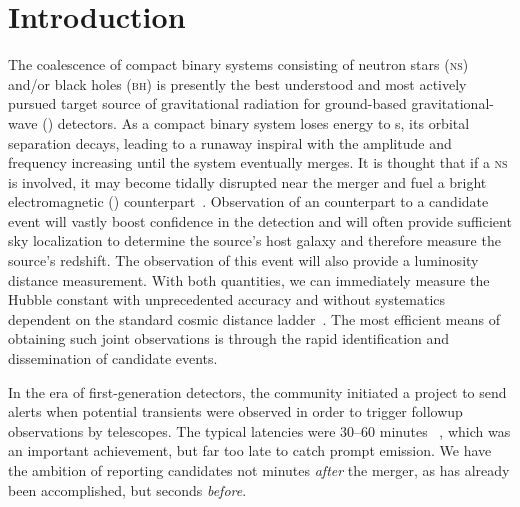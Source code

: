 \section{Introduction}
\label{sec:introduction}


The coalescence of compact binary systems consisting of neutron stars
 (\textsc{ns}) and/or black holes (\textsc{bh}) is presently the best
understood and most actively pursued target source of gravitational
radiation for ground-based gravitational-wave (\GW{}) detectors.
As a compact binary system loses energy to \GW{}s, its
orbital separation decays, leading to a runaway inspiral with the \GW{}
amplitude and frequency increasing until the system eventually merges.  It is
thought that if a \textsc{ns} is involved, it may become tidally disrupted near
the merger and fuel a bright electromagnetic (\EM{})
counterpart~\citep{shibata:2007}. Observation of an \EM{} counterpart to a
candidate \GW{} event will vastly boost confidence in the \GW{} detection and
will often provide sufficient sky localization to determine
the source's host galaxy and therefore measure the source's redshift. The
\GW{} observation of this event will also provide a luminosity
distance measurement. With both quantities, we can
immediately measure the Hubble constant with unprecedented
accuracy and without systematics dependent on the standard cosmic distance
ladder~\citep{2010ApJ...725..496N}. The most efficient means of obtaining
such joint observations is through the rapid identification and dissemination
of candidate \GW{} events.

In the era of first-generation detectors, the \GW{} community initiated a
project to send alerts when potential \GW{} transients were observed in order
to trigger followup observations by \EM{} telescopes.  The typical latencies
were 30--60 minutes ~\citep{HugheyGWPAW2011}, which was an important
achievement, but far too late to catch prompt \EM{} emission. We have the
ambition of reporting \GW{} candidates not minutes \emph{after} the merger, as
has already been accomplished, but seconds \emph{before}.

